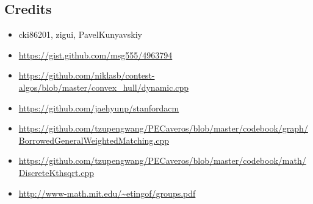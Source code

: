 \documentclass[landscape, 8pt, a4paper, oneside, twocolumn]{extarticle}
\begin{document}
\subsection {Credits}
\begin{itemize}[noitemsep,nolistsep]
	\item cki86201, zigui, PavelKunyavskiy
	\item \url{https://gist.github.com/msg555/4963794}
	\item \url{https://github.com/niklasb/contest-algos/blob/master/convex_hull/dynamic.cpp}
	\item \url{https://github.com/jaehyunp/stanfordacm}
	\item \url{https://github.com/tzupengwang/PECaveros/blob/master/codebook/graph/BorrowedGeneralWeightedMatching.cpp}
	\item \url{https://github.com/tzupengwang/PECaveros/blob/master/codebook/math/DiscreteKthsqrt.cpp}
	\item \url{http://www-math.mit.edu/~etingof/groups.pdf}
\end{itemize}
\end{document}
